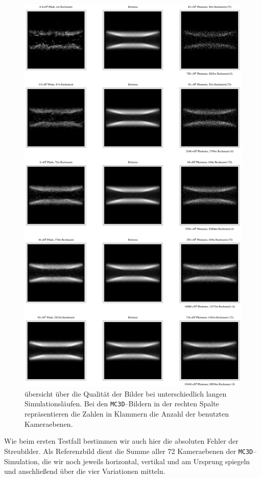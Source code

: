 		\begin{figure}
			\centering
			\includegraphics[height=1.0\textheight]{diskimageoverview.eps}
			\caption{übersicht über die Qualität der Bilder bei unterschiedlich langen Simulationsläufen. Bei den \texttt{MC3D}--Bildern in der rechten Spalte repräsentieren die Zahlen in Klammern die Anzahl der benutzten Kameraebenen.}
			\label{fig:disk_image_overview}
		\end{figure}
	
	Wie beim ersten Testfall bestimmen wir auch hier die absoluten Fehler der Streubilder. Als Referenzbild dient die Summe aller 72 Kameraebenen der \texttt{MC3D}--Simulation, die wir noch jeweils horizontal, vertikal und am Ursprung spiegeln und anschließend über die vier Variationen mitteln.

